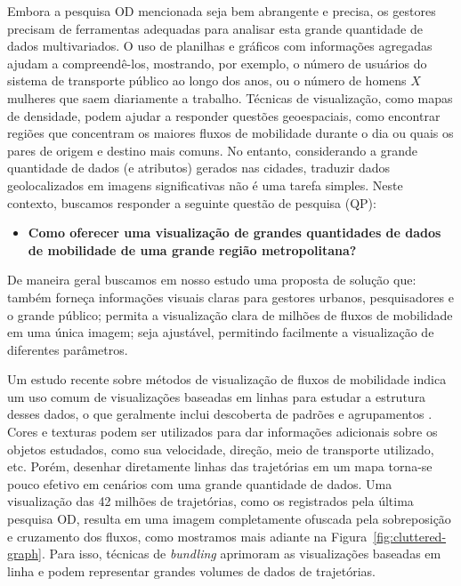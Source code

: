 Embora a pesquisa OD mencionada seja bem abrangente e precisa, 
os gestores precisam de ferramentas adequadas para analisar esta grande quantidade de
dados multivariados. O uso de planilhas e gráficos com informações agregadas
ajudam a compreendê-los, mostrando, por exemplo, o número de usuários 
do sistema de transporte público ao longo dos anos, ou o número de homens ${X}$ mulheres
que saem diariamente a trabalho. Técnicas de visualização, como mapas de densidade,
podem ajudar a responder questões geoespaciais, como encontrar regiões que concentram
os maiores fluxos de mobilidade durante o dia ou quais os pares de origem e destino
mais comuns. No entanto, considerando a grande quantidade de dados (e atributos) gerados
nas cidades, traduzir dados geolocalizados em imagens significativas não é uma tarefa simples.
Neste contexto, buscamos responder a seguinte questão de pesquisa (QP):

\begin{itemize}
  \item \textbf{Como oferecer uma visualização de grandes quantidades de
dados de mobilidade de uma grande região metropolitana?}
\end{itemize}

De maneira geral buscamos em nosso estudo uma proposta de solução que: também
forneça informações visuais claras para gestores urbanos, pesquisadores e o
grande público; permita a visualização clara de milhões de fluxos de mobilidade
em uma única imagem; seja ajustável, permitindo facilmente a visualização de
diferentes parâmetros.

Um estudo recente sobre métodos de visualização de fluxos de mobilidade indica
um uso comum de visualizações baseadas em linhas para estudar a estrutura desses
dados, o que geralmente inclui descoberta de padrões e agrupamentos
\cite{Chen2015}. Cores e texturas podem ser utilizados para dar informações
adicionais sobre os objetos estudados, como sua velocidade, direção, meio de
transporte utilizado, etc. Porém, desenhar diretamente linhas das trajetórias em
um mapa torna-se pouco efetivo em cenários com uma grande quantidade de dados.
Uma visualização das 42 milhões de trajetórias, como os registrados pela última
pesquisa OD, resulta em uma imagem completamente ofuscada pela sobreposição e
cruzamento dos fluxos, como mostramos mais adiante na
Figura~\ref{fig:cluttered-graph}. Para isso, técnicas de \emph{bundling}
aprimoram as visualizações baseadas em linha e podem representar grandes volumes
de dados de trajetórias.

